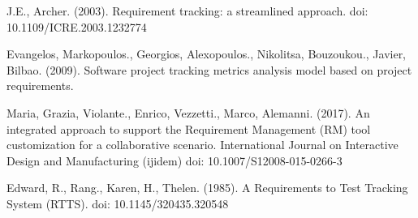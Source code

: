 \begin{thebibliography}{00}
    J.E., Archer. (2003).
    Requirement tracking: a streamlined approach.
    doi: 10.1109/ICRE.2003.1232774

    Evangelos, Markopoulos., Georgios, Alexopoulos., Nikolitsa, Bouzoukou., Javier, Bilbao. (2009).
    Software project tracking metrics analysis model based on project requirements.

    Maria, Grazia, Violante., Enrico, Vezzetti., Marco, Alemanni. (2017).
    An integrated approach to support the Requirement Management (RM) tool customization for a collaborative scenario.
    International Journal on Interactive Design and Manufacturing (ijidem)
    doi: 10.1007/S12008-015-0266-3

    Edward, R., Rang., Karen, H., Thelen. (1985).
    A Requirements to Test Tracking System (RTTS).
    doi: 10.1145/320435.320548

\end{thebibliography}
